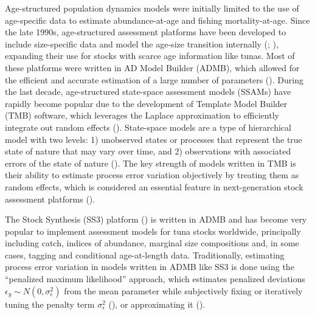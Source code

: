 \documentclass[
]{scrartcl}
\begin{document}
Age-structured population dynamics models were initially limited to the
use of age-specific data to estimate abundance-at-age and fishing
mortality-at-age. Since the late 1990s, age-structured assessment
platforms have been developed to include size-specific data and model
the age-size transition internally
(; ), expanding their use for stocks with scarce age
information like tunas. Most of these platforms were written in AD Model
Builder (ADMB), which allowed for the efficient and accurate estimation
of a large number of parameters
().
During the last decade, age-structured state-space assessment models
(SSAMs) have rapidly become popular due to the development of Template
Model Builder (TMB) software, which leverages the Laplace approximation
to efficiently integrate out random effects
(). State-space models are a type of hierarchical model with
two levels: 1) unobserved states or processes that represent the true
state of nature that may vary over time, and 2) observations with
associated errors of the state of nature
(). The key strength of models written in TMB is their ability to
estimate process error variation objectively by treating them as random
effects, which is considered an essential feature in next-generation
stock assessment platforms
().

The Stock Synthesis (SS3) platform
() is written in ADMB and has become very popular to implement
assessment models for tuna stocks worldwide, principally including
catch, indices of abundance, marginal size compositions and, in some
cases, tagging and conditional age-at-length data. Traditionally,
estimating process error variation in models written in ADMB like SS3 is
done using the ``penalized maximum likelihood'' approach, which
estimates penalized deviations
\(\epsilon_y \sim N(0,\sigma_\epsilon^2)\) from the mean parameter while
subjectively fixing or iteratively tuning the penalty term
\(\sigma_\epsilon^2\) (), or approximating it
().
\end{document}
